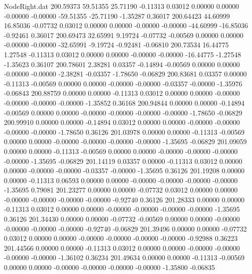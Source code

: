 \begin{filecontents}{NodeRight.dat}
 200.59373   59.51355   25.71190    -0.11313    0.03012    0.00000    0.00000   -0.00000   -0.00000  -59.51355  -25.71190   -1.35287    0.36017
 200.64423   44.60999   16.85036    -0.07732    0.03012    0.00000    0.00000   -0.00000   -0.00000  -44.60999  -16.85036   -0.92461    0.36017
 200.69473   32.65991    9.19724    -0.07732   -0.00569    0.00000    0.00000   -0.00000   -0.00000  -32.65991   -9.19724   -0.92481   -0.06810
 200.73534   16.44775    1.27548    -0.11313    0.03012    0.00000    0.00000   -0.00000   -0.00000  -16.44775   -1.27548   -1.35623    0.36107
 200.78601    2.38281    0.03357    -0.14894   -0.00569    0.00000    0.00000   -0.00000   -0.00000   -2.38281   -0.03357   -1.78650   -0.06829
 200.83681    0.03357    0.00000    -0.11313   -0.00569    0.00000    0.00000   -0.00000   -0.00000   -0.03357   -0.00000   -1.35976   -0.06843
 200.88759    0.00000    0.00000    -0.11313    0.03012    0.00000    0.00000   -0.00000   -0.00000   -0.00000   -0.00000   -1.35852    0.36168
 200.94844    0.00000    0.00000    -0.14894   -0.00569    0.00000    0.00000   -0.00000   -0.00000   -0.00000   -0.00000   -1.78650   -0.06829
 200.99910    0.00000    0.00000    -0.14894    0.03012    0.00000    0.00000   -0.00000   -0.00000   -0.00000   -0.00000   -1.78650    0.36126
 201.03978    0.00000    0.00000    -0.11313   -0.00569    0.00000    0.00000   -0.00000   -0.00000   -0.00000   -0.00000   -1.35695   -0.06829
 201.09059    0.00000    0.00000    -0.11313   -0.00569    0.00000    0.00000   -0.00000   -0.00000   -0.00000   -0.00000   -1.35695   -0.06829
 201.14119    0.03357    0.00000    -0.11313    0.03012    0.00000    0.00000   -0.00000   -0.00000   -0.03357   -0.00000   -1.35695    0.36126
 201.19208    0.00000    0.00000    -0.11313    0.06593    0.00000    0.00000   -0.00000   -0.00000   -0.00000   -0.00000   -1.35695    0.79081
 201.23277    0.00000    0.00000    -0.07732    0.03012    0.00000    0.00000   -0.00000   -0.00000   -0.00000   -0.00000   -0.92740    0.36126
 201.28333    0.00000    0.00000    -0.11313    0.03012    0.00000    0.00000   -0.00000   -0.00000   -0.00000   -0.00000   -1.35695    0.36126
 201.34430    0.00000    0.00000    -0.07732   -0.00569    0.00000    0.00000   -0.00000   -0.00000   -0.00000   -0.00000   -0.92740   -0.06829
 201.39496    0.00000    0.00000    -0.07732    0.03012    0.00000    0.00000   -0.00000   -0.00000   -0.00000   -0.00000   -0.92988    0.36223
 201.44566    0.00000    0.00000    -0.11313    0.03012    0.00000    0.00000   -0.00000   -0.00000   -0.00000   -0.00000   -1.36102    0.36234
 201.49634    0.00000    0.00000    -0.11313   -0.00569    0.00000    0.00000   -0.00000   -0.00000   -0.00000   -0.00000   -1.35800   -0.06835

\end{filecontents}
